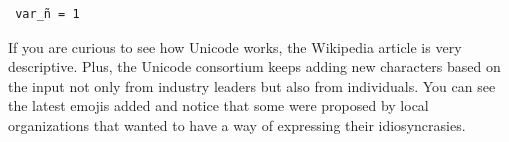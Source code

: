 \begin{verbatim}
 var_ñ = 1
\end{verbatim}

If you are curious to see how Unicode works, the Wikipedia article is very descriptive. Plus, the Unicode consortium keeps adding new characters based on the input not only from industry leaders but also from individuals. You can see the latest emojis added and notice that some were proposed by local organizations that wanted to have a way of expressing their idiosyncrasies.
